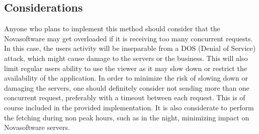 \documentclass{article}
\begin{document}
	\subsection{Considerations}
	Anyone who plans to implement this method should consider that the Novasoftware may get overloaded if it is receiving too many concurrent requests. In this case, the users activity will be inseparable from a DOS (Denial of Service) attack, which might cause damage to the servers or the business. This will also limit regular users ability to use the viewer as it may slow down or restrict the availability of the application. In order to minimize the risk of slowing down or damaging the servers, one should definitely consider not sending more than one concurrent request, preferably with a timeout between each request. This is of course included in the provided implementation. It is also considerate to perform the fetching during non peak hours, such as in the night, minimizing impact on Novasoftware servers.
	
\end{document}
